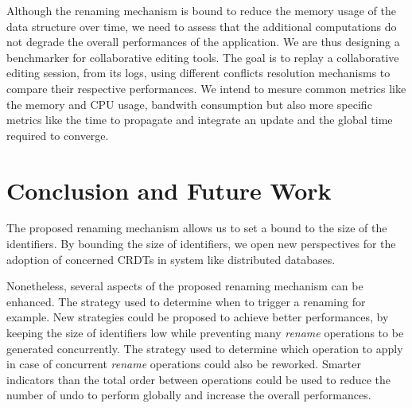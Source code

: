 \documentclass[sigplan]{acmart}
\begin{document}
Although the renaming mechanism is bound to reduce the memory usage of the data structure over time, we need to assess that the additional computations do not degrade the overall performances of the application.
We are thus designing a benchmarker for collaborative editing tools.
The goal is to replay a collaborative editing session, from its logs, using different conflicts resolution mechanisms to compare their respective performances.
We intend to mesure common metrics like the memory and CPU usage, bandwith consumption but also more specific metrics like the time to propagate and integrate an update and the global time required to converge.

\section{Conclusion and Future Work}

The proposed renaming mechanism allows us to set a bound to the size of the identifiers.
By bounding the size of identifiers, we open new perspectives for the adoption of concerned \acp{CRDT} in system like distributed databases.

Nonetheless, several aspects of the proposed renaming mechanism can be enhanced.
The strategy used to determine when to trigger a renaming for example.
New strategies could be proposed to achieve better performances, by keeping the size of identifiers low while preventing many \emph{rename} operations to be generated concurrently.
The strategy used to determine which operation to apply in case of concurrent \emph{rename} operations could also be reworked. Smarter indicators than the total order between operations could be used to reduce the number of undo to perform globally and increase the overall performances.



\end{document}
